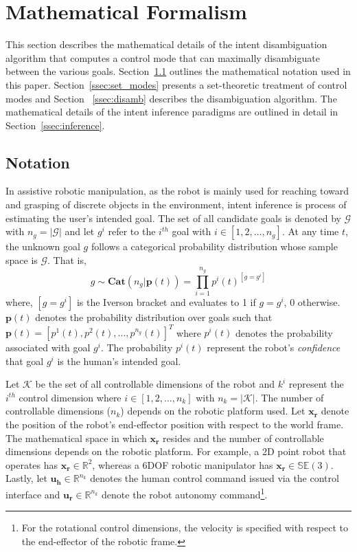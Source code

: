 \documentclass[conference]{IEEEtran}
\begin{document}
\section{Mathematical Formalism}\label{sec:math}
This section describes the mathematical details of the intent disambiguation algorithm that computes a control mode that can maximally disambiguate between the various goals. Section~\ref{ssec:notation} outlines the mathematical notation used in this paper. Section~\ref{ssec:set_modes} presents a set-theoretic treatment of control modes and Section ~\ref{ssec:disamb} describes the disambiguation algorithm. The mathematical details of the intent inference paradigms are outlined in detail in Section~\ref{ssec:inference}.
\subsection{Notation}\label{ssec:notation}
 In assistive robotic manipulation, as the robot is mainly used for reaching toward and grasping of discrete objects in the environment, intent inference is process of estimating the user's intended goal. The set of all candidate goals is denoted by $\mathcal{G}$ with $n_g = \vert\mathcal{G}\vert$ and let $g^i$ refer to the $i^{th}$ goal with $i \in [1,2,\dots, n_g]$. At any time $t$, the unknown goal $g$ follows a categorical probability distribution whose sample space is $\mathcal{G}$. 
 That is, 
 \begin{equation*}
 g \sim \textbf{Cat}(n_g | \boldsymbol{p}(t)) = \prod_{i=1}^{n_g}p^{i}(t)^{[g = g^i]}
 \end{equation*}
where, $[g = g^i]$ is the Iverson bracket and evaluates to 1 if $g = g^i$, 0 otherwise. $\boldsymbol{p}(t)$ denotes the probability distribution over goals such that $\boldsymbol{p}(t) = [p^1(t), p^2(t),\dots, p^{n_g}(t)]^{T}$ where $p^i(t)$ denotes the probability associated with goal $g^i$.  The probability $p^i(t)$ represent the robot's \textit{confidence} that goal $g^i$ is the human's intended goal. 

Let $\mathcal{K}$ be the set of all controllable dimensions of the robot and $k^i$ represent the $i^{th}$ control dimension where $i \in [1,2,\dots,n_k]$ with $n_k = \vert\mathcal{K}\vert$. The number of controllable dimensions ($n_k$) depends on the robotic platform used. Let $\boldsymbol{x_r}$ denote the position of the robot's end-effector position with respect to the world frame. The mathematical space in which $\boldsymbol{x_r}$ resides and the number of controllable dimensions depends on the robotic platform. For example, a 2D point robot that operates has $\boldsymbol{x_r} \in \mathbb{R}^2$, whereas a 6DOF robotic manipulator has $\boldsymbol{x_r} \in \mathbb{SE}(3)$. Lastly, let $\boldsymbol{u_h} \in \mathbb{R}^{n_k}$ denotes the human control command issued via the control interface and $\boldsymbol{u_r} \in \mathbb{R}^{n_k}$ denote the robot autonomy command\footnote{For the rotational control dimensions, the velocity is specified with respect to the end-effector of the robotic frame.}. 
\end{document}

